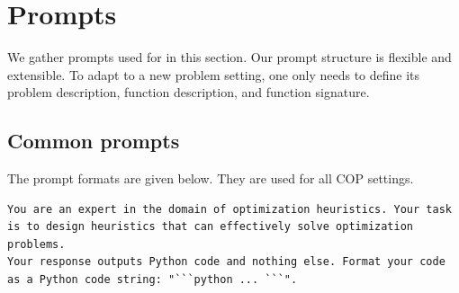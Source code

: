 \section{Prompts}\label{app: prompts}

We gather prompts used for \our{} in this section. Our prompt structure is flexible and extensible. To adapt \our{} to a new problem setting, one only needs to define its problem description, function description, and function signature.

\subsection{Common prompts}
The prompt formats are given below. They are used for all COP settings.




\renewcommand{\lstlistingname}{Prompt}

\begin{lstlisting}[caption={System prompt for generator LLM.},  label={lst: system prompt for generator LLM}, style=promptstyle]
You are an expert in the domain of optimization heuristics. Your task is to design heuristics that can effectively solve optimization problems.
Your response outputs Python code and nothing else. Format your code as a Python code string: "```python ... ```".    
\end{lstlisting}

